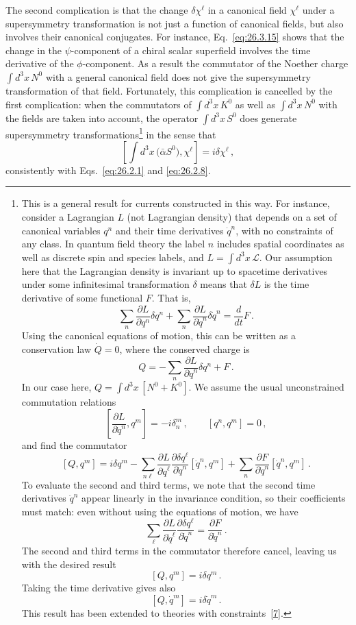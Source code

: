 The second complication is that the change \(\delta\chi^\ell\) in a canonical
field \(\chi^\ell\) under a supersymmetry transformation is not just a
function of canonical fields, but also involves their canonical conjugates.
For instance, Eq.~\eqref{eq:26.3.15} shows that the change in the
\(\psi\)-component of a chiral scalar superfield involves the time derivative
of the \(\phi\)-component. As a result the commutator of the Noether charge
\(\int d^3x\,N^0\) with a general canonical field does not give the
supersymmetry transformation of that field. Fortunately, this complication
is cancelled by the first complication: when the commutators of
\(\int d^3x\,K^0\) as well as \(\int d^3x\,N^0\) with the fields are taken
into account, the operator \(\int d^3x\,S^0\) does generate supersymmetry
transformations\footnote{This is a general result for currents constructed in
this way. For instance, consider a Lagrangian \(L\) (not Lagrangian density)
that depends on a set of canonical variables \(q^n\) and their time
derivatives \(\dot q^n\), with no constraints of any class. In quantum field
theory the label \(n\) includes spatial coordinates as well as discrete spin
and species labels, and \(L=\int d^3x\,\mathcal{L}\). Our assumption here
that the Lagrangian density is invariant up to spacetime derivatives under
some infinitesimal transformation \(\delta\) means that \(\delta L\) is the
time derivative of some functional \(F\). That is,
\[
  \sum_n\frac{\partial L}{\partial q^n}\delta q^n
  +\sum_n\frac{\partial L}{\partial\dot q^n}\delta\dot q^n
  =\frac{d}{dt}F\,.
\]
Using the canonical equations of motion, this can be written as a
conservation law \(\dot Q=0\), where the conserved charge is
\[
  Q=-\sum_n\frac{\partial L}{\partial\dot q^n}\delta q^n+F\,.
\]
In our case here, \(Q=\int d^3x\,[N^0+K^0]\). We assume the usual
unconstrained commutation relations
\[
  \left[\frac{\partial L}{\partial\dot q^n},q^m\right]
  =-i\delta_n^m\,,
  \qquad
  [q^n,q^m]=0\,,
\]
and find the commutator
\[
  [Q,q^m]
  =i\delta q^m
  -\sum_{n\ell}
   \frac{\partial L}{\partial\dot q^\ell}
   \frac{\partial\delta q^\ell}{\partial\dot q^n}
   [\dot q^n,q^m]
  +\sum_n
   \frac{\partial F}{\partial\dot q^n}
   [\dot q^n,q^m]\,.
\]
To evaluate the second and third terms, we note that the second time
derivatives \(\ddot q^n\) appear linearly in the invariance condition, so
their coefficients must match: even without using the equations of motion,
we have
\[
  \sum_\ell
  \frac{\partial L}{\partial\dot q^\ell}
  \frac{\partial\delta q^\ell}{\partial\dot q^n}
  =\frac{\partial F}{\partial\dot q^n}\,.
\]
The second and third terms in the commutator therefore cancel, leaving us
with the desired result
\[
  [Q,q^m]=i\delta q^m\,.
\]
Taking the time derivative gives also
\[
  [Q,\dot q^m]=i\delta\dot q^m\,.
\]
This result has been extended to theories with
constraints~\hyperref[ch26-ref-7]{[7]}.} in the sense that
\begin{equation}
  \left[
    \int d^3x\,\bigl(\bar\alpha S^0\bigr),\chi^\ell
  \right]
  =i\delta\chi^\ell\,,
  \tag{26.7.6}\label{eq:26.7.6}
\end{equation}
consistently with Eqs.~\eqref{eq:26.2.1} and \eqref{eq:26.2.8}.


